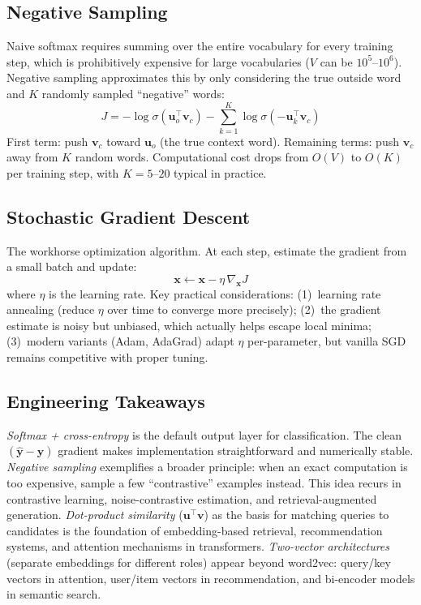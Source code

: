 \documentclass[11pt]{article}
\begin{document}
\subsection{Negative Sampling}
Naive softmax requires summing over the entire vocabulary for every training step, which is prohibitively expensive for large vocabularies ($V$ can be $10^5$--$10^6$). Negative sampling approximates this by only considering the true outside word and $K$ randomly sampled ``negative'' words:
\[
J = -\log\sigma(\mathbf{u}_o^\top \mathbf{v}_c) - \sum_{k=1}^{K} \log\sigma(-\mathbf{u}_k^\top \mathbf{v}_c)
\]
First term: push $\mathbf{v}_c$ toward $\mathbf{u}_o$ (the true context word). Remaining terms: push $\mathbf{v}_c$ away from $K$ random words. Computational cost drops from $O(V)$ to $O(K)$ per training step, with $K = 5$--$20$ typical in practice.
\subsection{Stochastic Gradient Descent}
The workhorse optimization algorithm. At each step, estimate the gradient from a small batch and update:
\[
\mathbf{x} \leftarrow \mathbf{x} - \eta \, \nabla_{\mathbf{x}} J
\]
where $\eta$ is the learning rate. Key practical considerations: (1)~learning rate annealing (reduce $\eta$ over time to converge more precisely); (2)~the gradient estimate is noisy but unbiased, which actually helps escape local minima; (3)~modern variants (Adam, AdaGrad) adapt $\eta$ per-parameter, but vanilla SGD remains competitive with proper tuning.
\subsection{Engineering Takeaways}
\textit{Softmax + cross-entropy} is the default output layer for classification. The clean $(\hat{\mathbf{y}} - \mathbf{y})$ gradient makes implementation straightforward and numerically stable.
\textit{Negative sampling} exemplifies a broader principle: when an exact computation is too expensive, sample a few ``contrastive'' examples instead. This idea recurs in contrastive learning, noise-contrastive estimation, and retrieval-augmented generation.
\textit{Dot-product similarity} ($\mathbf{u}^\top \mathbf{v}$) as the basis for matching queries to candidates is the foundation of embedding-based retrieval, recommendation systems, and attention mechanisms in transformers.
\textit{Two-vector architectures} (separate embeddings for different roles) appear beyond word2vec: query/key vectors in attention, user/item vectors in recommendation, and bi-encoder models in semantic search.
\end{document}
